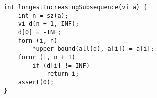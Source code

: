 \begin{verbatim}
int longestIncreasingSubsequence(vi a) {
	int n = sz(a);
	vi d(n + 1, INF);
	d[0] = -INF;
	forn (i, n) 
		*upper_bound(all(d), a[i]) = a[i]; 					
	fornr (i, n + 1)
		if (d[i] != INF)
			return i;
	assert(0);
}
\end{verbatim}
